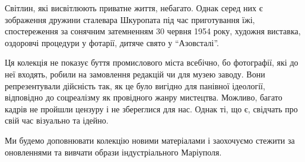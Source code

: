 Світлин, які висвітлюють приватне життя, небагато. Однак серед них є зображення
дружини сталевара Шкуропата під час приготування їжі, спостереження за сонячним
затемненням 30 червня 1954 року, художня виставка, оздоровчі процедури у
фотарії, дитяче свято у \enquote{Азовсталі}.

Ця колекція не показує буття промислового міста всебічно, бо фотографії, які до
неї входять, робили на замовлення редакцій чи для музею заводу. Вони
репрезентували дійсність так, як це було вигідно для панівної ідеології,
відповідно до соцреалізму як провідного жанру мистецтва. Можливо, багато кадрів
не пройшли цензуру і не збереглися для нас. Однак ті, що є, свідчать про свій
час візуально та ідейно.

Ми будемо доповнювати колекцію новими матеріалами і заохочуємо стежити за
оновленнями та вивчати образи індустріального Маріуполя.

